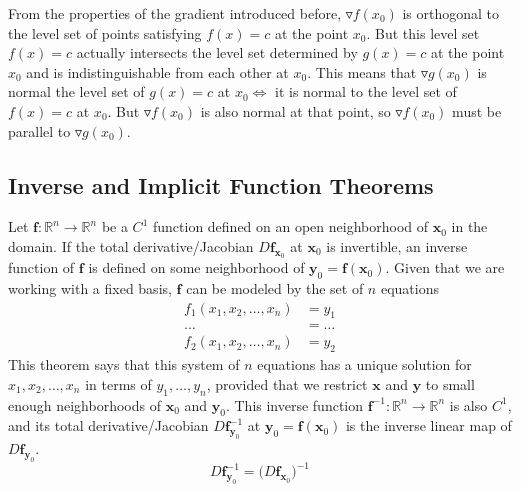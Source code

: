   From the properties of the gradient introduced before, $\triangledown f(x_0)$ is orthogonal to the level set of points satisfying $f(x) = c$ at the point $x_0$. But this level set $f(x) = c$ actually intersects the level set determined by $g(x) = c$ at the point $x_0$ and is indistinguishable from each other at $x_0$. This means that $\triangledown g(x_0)$ is normal the level set of $g(x) = c$ at $x_0 \iff $ it is normal to the level set of $f(x) = c$ at $x_0$. But $\triangledown f(x_0)$ is also normal at that point, so $\triangledown f(x_0)$ must be parallel to $\triangledown g(x_0)$. 
 
\subsection{Inverse and Implicit Function Theorems} 

  \begin{theorem}
  Let $\mathbf{f}: \mathbb{R}^n \longrightarrow \mathbb{R}^n$ be a $C^1$ function defined on an open neighborhood of $\mathbf{x}_0$ in the domain. If the total derivative/Jacobian $D \mathbf{f}_{\mathbf{x}_0}$ at $\mathbf{x}_0$ is invertible, an inverse function of $\mathbf{f}$ is defined on some neighborhood of $\mathbf{y}_0 = \mathbf{f}(\mathbf{x}_0)$. Given that we are working with a fixed basis, $\mathbf{f}$ can be modeled by the set of $n$ equations 
  \begin{align*}
      f_1 (x_1, x_2, \ldots, x_n) &= y_1 \\
      \ldots & = \ldots \\
      f_2 (x_1, x_2, \ldots, x_n) &= y_2
  \end{align*}
  This theorem says that this system of $n$ equations has a unique solution for $x_1, x_2, \ldots, x_n$ in terms of $y_1, \ldots, y_n$, provided that we restrict $\mathbf{x}$ and $\mathbf{y}$ to small enough neighborhoods of $\mathbf{x}_0$ and $\mathbf{y}_0$. This inverse function $\mathbf{f}^{-1}: \mathbb{R}^n \longrightarrow \mathbb{R}^n$ is also $C^1$, and its total derivative/Jacobian $D \mathbf{f}^{-1}_{\mathbf{y}_0}$ at $\mathbf{y}_0 = \mathbf{f}(\mathbf{x}_0)$ is the inverse linear map of $D \mathbf{f}_{\mathbf{y}_0}$. 
  \[D \mathbf{f}^{-1}_{\mathbf{y}_0} = \big( D \mathbf{f}_{\mathbf{x}_0} \big)^{-1}\]
  \end{theorem}

